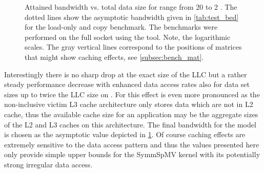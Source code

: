 \begin{figure}[tbp]
	\centering
	\caption{Attained bandwidth vs. total data size for range from 20 \MB to 2 \GB. The dotted lines show the asymptotic bandwidth given in \cref{tab:test_bed} for the load-only and copy benchmark. The benchmarks were performed on the full socket using the \likwidBench tool. Note, the logarithmic scales. The gray vertical lines correspond to the positions of matrices that might show caching effects, see \cref{subsec:bench_mat}.}
	\label{fig:size_vs_bw}
\end{figure}
Interestingly there is no sharp drop at the exact size of the \acrshort{LLC} but a rather steady performance decrease with enhanced data access rates also for data set sizes up to twice the \acrshort{LLC} size on \IVB. For \SKX this effect is even more pronounced as the non-inclusive victim L3 cache architecture only stores data which are not in L2 cache, thus the available cache size for an application may be the aggregate sizes of the L2 and L3 caches on this architecture.  The final bandwidth for the  \roofline model is chosen as the asymptotic value depicted in \cref{fig:size_vs_bw}. Of course caching effects are extremely sensitive to the data access pattern and thus the values presented here only provide simple upper bounds for the \acrshort{SymmSpMV} kernel with its potentially strong irregular data access. 

